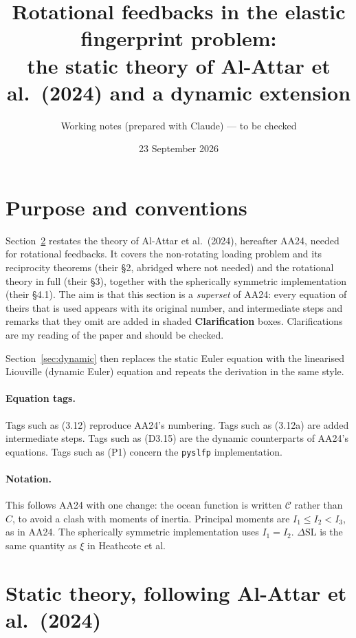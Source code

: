 \documentclass[11pt,a4paper]{article}
\title{Rotational feedbacks in the elastic fingerprint problem:\\
the static theory of Al-Attar et al.\ (2024) and a dynamic extension}
\author{Working notes (prepared with Claude) --- to be checked}
\date{23 September 2026}
\newcommand{\dSL}{\Delta\mathrm{SL}}
\newcommand{\oc}{\mathcal{C}}
\begin{document}
\maketitle

\tableofcontents

\section{Purpose and conventions}

Section~\ref{sec:static} restates the theory of Al-Attar et al.\ (2024), hereafter AA24, needed for
rotational feedbacks. It covers the non-rotating loading problem and its reciprocity theorems (their
\S2, abridged where not needed) and the rotational theory in full (their \S3), together with the
spherically symmetric implementation (their \S4.1). The aim is that this section is a
\emph{superset} of AA24: every equation of theirs that is used appears with its original number,
and intermediate steps and remarks that they omit are added in shaded \textbf{Clarification}
boxes. Clarifications are my reading of the paper and should be checked.

Section~\ref{sec:dynamic} then replaces the static Euler equation with the linearised Liouville
(dynamic Euler) equation and repeats the derivation in the same style.

\paragraph{Equation tags.} Tags such as (3.12) reproduce AA24's numbering. Tags such as (3.12a)
are added intermediate steps. Tags such as (D3.15) are the dynamic counterparts of AA24's
equations. Tags such as (P1) concern the \texttt{pyslfp} implementation.

\paragraph{Notation.} This follows AA24 with one change: the ocean function is written $\oc$
rather than $C$, to avoid a clash with moments of inertia. Principal moments are
$I_1\le I_2<I_3$, as in AA24. The spherically symmetric implementation uses $I_1=I_2$. $\dSL$ is
the same quantity as $\xi$ in Heathcote et al.

\section{Static theory, following Al-Attar et al.\ (2024)}
\label{sec:static}
\end{document}
